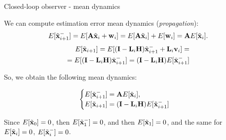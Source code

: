 \documentclass{beamer}
\newcommand{\btil}[1] {\Tilde{\mathbf{#1}}}
\begin{document}
\begin{frame}{Closed-loop observer - mean dynamics}
	\begin{flushleft}
		
		We can compute estimation error mean dynamics (\emph{propagation}):
				\begin{align*}
		E[\btil{x}_{i+1}^-] = 
		E[\bo{A} \btil{x}_i + \bo{w}_i] = 
		E[\bo{A} \btil{x}_i] + E[\bo{w}_i]  =
		\bo{A}E[\btil{x}_i].
				\end{align*}	
				\begin{align*}
		E[\btil{x}_{i+1}] = 
		E[(\bo{I} - \bo{L}_i \bo{H}) \btil{x}_{i+1}^- + \bo{L}_i\bo{v}_i] =\\
		=E[(\bo{I} - \bo{L}_i \bo{H}) \btil{x}_{i+1}^-]
		= 
		(\bo{I} - \bo{L}_i \bo{H}) E[\btil{x}_{i+1}^-]
				\end{align*}				
		
		So, we obtain the following mean dynamics:
		
				\begin{equation}
						\begin{cases}
								E[\btil{x}_{i+1}^-] = \bo{A} E[\btil{x}_i], \\
								E[\btil{x}_{i+1}] = (\bo{I} - \bo{L}_i \bo{H}) E[\btil{x}_{i+1}^-]
							\end{cases}
					\end{equation}		
		
		Since $E[\btil{x}_0] = 0$, then $E[\btil{x}_1^-] = 0$, and then $E[\btil{x}_1] = 0$, and the same for $E[\btil{x}_i] = 0$, $E[\btil{x}_i^-] = 0$.
		
	\end{flushleft}
\end{frame}
\end{document}
